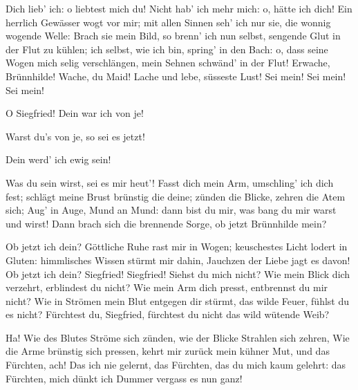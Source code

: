 \begin{drama}
\Siegfriedspeaks

Dich lieb' ich:
o liebtest mich du!
Nicht hab' ich mehr mich:
o, hätte ich dich!
Ein herrlich Gewässer
wogt vor mir;
mit allen Sinnen
seh' ich nur sie,
die wonnig wogende Welle:
Brach sie mein Bild,
so brenn' ich nun selbst,
sengende Glut
in der Flut zu kühlen;
ich selbst, wie ich bin,
spring' in den Bach:
o, dass seine Wogen
mich selig verschlängen,
mein Sehnen schwänd' in der Flut!
Erwache, Brünnhilde!
Wache, du Maid!
Lache und lebe,
süsseste Lust!
Sei mein! Sei mein! Sei mein!

\Brunnhildespeaks


O Siegfried! Dein
war ich von je!

\Siegfriedspeaks


Warst du's von je,
so sei es jetzt!

\Brunnhildespeaks

Dein werd' ich
ewig sein!

\Siegfriedspeaks

Was du sein wirst,
sei es mir heut'!
Fasst dich mein Arm,
umschling' ich dich fest;
schlägt meine Brust
brünstig die deine;
zünden die Blicke,
zehren die Atem sich;
Aug' in Auge,
Mund an Mund:
dann bist du mir,
was bang du mir warst und wirst!
Dann brach sich die brennende Sorge,
ob jetzt Brünnhilde mein?


\Brunnhildespeaks

Ob jetzt ich dein?
Göttliche Ruhe
rast mir in Wogen;
keuschestes Licht
lodert in Gluten:
himmlisches Wissen
stürmt mir dahin,
Jauchzen der Liebe
jagt es davon!
Ob jetzt ich dein?
Siegfried! Siegfried!
Siehst du mich nicht?
Wie mein Blick dich verzehrt,
erblindest du nicht?
Wie mein Arm dich presst,
entbrennst du mir nicht?
Wie in Strömen mein Blut
entgegen dir stürmt,
das wilde Feuer,
fühlst du es nicht?
Fürchtest du, Siegfried,
fürchtest du nicht
das wild wütende Weib?


\Siegfriedspeaks


Ha!
Wie des Blutes Ströme sich zünden,
wie der Blicke Strahlen sich zehren,
Wie die Arme brünstig sich pressen,
kehrt mir zurück
mein kühner Mut,
und das Fürchten, ach!
Das ich nie gelernt,
das Fürchten, das du
mich kaum gelehrt:
das Fürchten, mich dünkt
ich Dummer vergass es nun ganz!


\end{drama}
